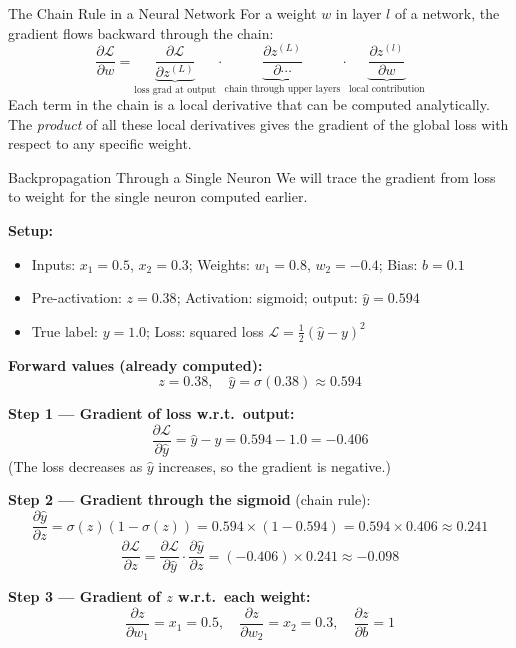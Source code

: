 \begin{conceptbox}{The Chain Rule in a Neural Network}
For a weight $w$ in layer $l$ of a network, the gradient flows backward through the chain:
\[
    \frac{\partial \mathcal{L}}{\partial w} =
    \underbrace{\frac{\partial \mathcal{L}}{\partial z^{(L)}}}_{\text{loss grad at output}}
    \cdot
    \underbrace{\frac{\partial z^{(L)}}{\partial \cdots}}_{\text{chain through upper layers}}
    \cdot
    \underbrace{\frac{\partial z^{(l)}}{\partial w}}_{\text{local contribution}}
\]
Each term in the chain is a local derivative that can be computed analytically. The \emph{product} of all these local derivatives gives the gradient of the global loss with respect to any specific weight.
\end{conceptbox}

\begin{examplebox}{Backpropagation Through a Single Neuron}
We will trace the gradient from loss to weight for the single neuron computed earlier.

\textbf{Setup:}
\begin{itemize}
    \item Inputs: $x_1 = 0.5$, $x_2 = 0.3$; Weights: $w_1 = 0.8$, $w_2 = -0.4$; Bias: $b = 0.1$
    \item Pre-activation: $z = 0.38$; Activation: sigmoid; output: $\hat{y} = 0.594$
    \item True label: $y = 1.0$; Loss: squared loss $\mathcal{L} = \frac{1}{2}(\hat{y} - y)^2$
\end{itemize}

\textbf{Forward values (already computed):}
\[
    z = 0.38, \quad \hat{y} = \sigma(0.38) \approx 0.594
\]

\textbf{Step 1 --- Gradient of loss w.r.t.\ output:}
\[
    \frac{\partial \mathcal{L}}{\partial \hat{y}} = \hat{y} - y = 0.594 - 1.0 = -0.406
\]
(The loss decreases as $\hat{y}$ increases, so the gradient is negative.)

\textbf{Step 2 --- Gradient through the sigmoid} (chain rule):
\[
    \frac{\partial \hat{y}}{\partial z} = \sigma(z)(1 - \sigma(z)) = 0.594 \times (1 - 0.594) = 0.594 \times 0.406 \approx 0.241
\]
\[
    \frac{\partial \mathcal{L}}{\partial z} = \frac{\partial \mathcal{L}}{\partial \hat{y}} \cdot \frac{\partial \hat{y}}{\partial z} = (-0.406) \times 0.241 \approx -0.098
\]

\textbf{Step 3 --- Gradient of $z$ w.r.t.\ each weight:}
\[
    \frac{\partial z}{\partial w_1} = x_1 = 0.5, \quad
    \frac{\partial z}{\partial w_2} = x_2 = 0.3, \quad
    \frac{\partial z}{\partial b}  = 1
\]


\end{examplebox}
